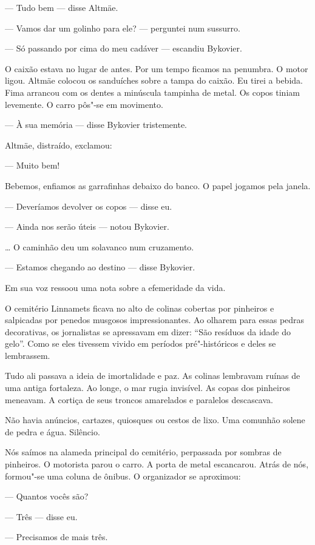 --- Tudo bem --- disse Altmäe.

--- Vamos dar um golinho para ele? --- perguntei num sussurro.

--- Só passando por cima do meu cadáver --- escandiu Bykovier.

O caixão estava no lugar de antes. Por um tempo ficamos na penumbra. O
motor ligou. Altmäe colocou os sanduíches sobre a tampa do caixão. Eu
tirei a bebida. Fima arrancou com os dentes a minúscula tampinha de
metal. Os copos tiniam levemente. O carro pôs"-se em movimento.

--- À sua memória --- disse Bykovier tristemente.

Altmäe, distraído, exclamou:

--- Muito bem!

Bebemos, enfiamos as garrafinhas debaixo do banco. O papel jogamos pela
janela.

--- Deveríamos devolver os copos --- disse eu.

--- Ainda nos serão úteis --- notou Bykovier.

\ldots{} O caminhão deu um solavanco num cruzamento.

--- Estamos chegando ao destino --- disse Bykovier.

Em sua voz ressoou uma nota sobre a efemeridade da vida.

O cemitério Linnamets ficava no alto de colinas cobertas por pinheiros e
salpicadas por penedos musgosos impressionantes. Ao olharem para essas
pedras decorativas, os jornalistas se apressavam em dizer: ``São
resíduos da idade do gelo''. Como se eles tivessem vivido em períodos
pré"-históricos e deles se lembrassem.

Tudo ali passava a ideia de imortalidade e paz. As colinas lembravam
ruínas de uma antiga fortaleza. Ao longe, o mar rugia invisível. As
copas dos pinheiros meneavam. A cortiça de seus troncos amarelados e
paralelos descascava.

Não havia anúncios, cartazes, quiosques ou cestos de lixo. Uma comunhão
solene de pedra e água. Silêncio.

Nós saímos na alameda principal do cemitério, perpassada por sombras de
pinheiros. O motorista parou o carro. A porta de metal escancarou. Atrás
de nós, formou"-se uma coluna de ônibus. O organizador se aproximou:

--- Quantos vocês são?

--- Três --- disse eu.

--- Precisamos de mais três.

